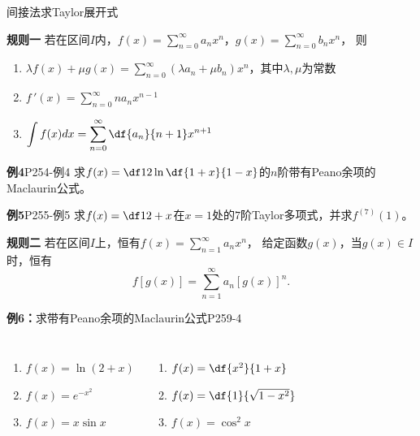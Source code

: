 \begin{frame}{间接法求Taylor展开式}
	\linespread{1.2}\pause 
	\begin{alertblock}{{\bf 规则一}\hfill}
		若在区间$I$内，$f(x)=\sum\limits_{n=0}^{\infty}a_nx^n$，$g(x)=\sum\limits_{n=0}^{\infty}b_nx^n$，
		则\pause 
		\begin{enumerate}
		  \item $\lambda f(x)+\mu g(x)=\sum\limits_{n=0}^{\infty}(\lambda a_n+\mu
		  b_n)x^n$，其中$\lambda,\mu$为常数\pause 
		  \item $f\,'(x)=\sum\limits_{n=0}^{\infty}na_{n}x^{n-1}$\pause 
		  \item $\displaystyle\int f(x)dx=\sum\limits_{n=0}^{\infty}
		  \df{a_{n}}{n+1}x^{n+1}$
		\end{enumerate}
	\end{alertblock}
\end{frame}

\begin{frame}
	\linespread{1.5}
	\begin{exampleblock}{{\bf 例4}\hfill P254-例4}
		求$f(x)=\df 12\ln\df{1+x}{1-x}$的$n$阶带有Peano余项的Maclaurin公式。
	\end{exampleblock}\pause 
	\bigskip
	\begin{exampleblock}{{\bf 例5}\hfill P255-例5}
		求$f(x)=\df 1{2+x}$在$x=1$处的$7$阶Taylor多项式，并求$f^{(7)}(1)$。
	\end{exampleblock}
\end{frame}

\begin{frame}
	\linespread{1.2}
	\begin{alertblock}{\bf 规则二}
		若在区间$I$上，恒有$f(x)=\sum\limits_{n=1}^{\infty}a_nx^n$，
		给定函数$g(x)$，当$g(x)\in I$时，恒有
		\vspace{-1em}
		$$f[g(x)]=\sum\limits_{n=1}^{\infty}a_n[g(x)]^n.$$
	\end{alertblock}\pause 
	\begin{exampleblock}{{\bf 例6：}求带有Peano余项的Maclaurin公式\hfill P259-4}
		\pause 
		\begin{columns}[t]
				\begin{enumerate}
				  \item $f(x)=\ln(2+x)$\pause 
				  \vspace{9pt}
				  \item $f(x)=e^{-x^2}$\pause
				  \vspace{6pt} 
				  \item $f(x)=x\sin x$\pause 
				\end{enumerate}
				\begin{enumerate}
				  \addtocounter{enumi}{3}
				  \item $f(x)=\df{x^2}{1+x}$\pause 
				  \item $f(x)=\df{1}{\sqrt{1-x^2}}$\pause 
				  \item $f(x)=\cos^2x$
				\end{enumerate}
		\end{columns}
	\end{exampleblock}
\end{frame}

